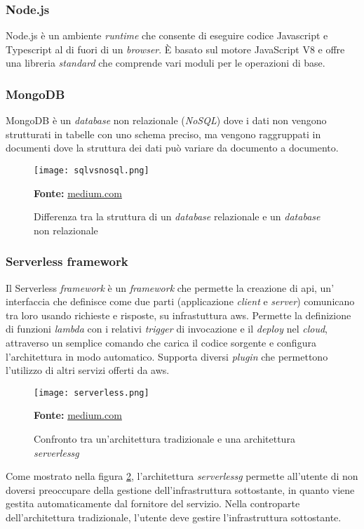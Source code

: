 \subsubsection{Node.js}
Node.js è un ambiente \textit{runtime} che consente di eseguire codice Javascript e Typescript al di fuori di un \textit{browser}. È basato sul motore JavaScript V8 e offre una libreria \textit{standard} che comprende vari moduli per le operazioni di base. 
\subsubsection{MongoDB}
MongoDB è un \textit{database} non relazionale (\textit{NoSQL}) dove i dati non vengono strutturati in tabelle con uno schema preciso, ma vengono raggruppati in documenti dove la struttura dei dati può variare da documento a documento.  
\begin{figure}[H]
    \centering
    \texttt{[image: sqlvsnosql.png]}
    \caption{Differenza tra la struttura di un \textit{database} relazionale e un \textit{database} non relazionale}
    \small \textbf{Fonte:} \href{https://naveen-metta.medium.com/decoding-the-database-dilemma-sql-vs-nosql-in-system-design-8666e21f4a58c}{medium.com}
    \label{fig:sql-vs-nosql}
\end{figure} 

\subsubsection{Serverless framework}
Il Serverless \textit{framework} è un \textit{framework} che permette la creazione di \gls{api}, un' interfaccia che definisce come due parti (applicazione \textit{client} e \textit{server}) comunicano tra loro usando richieste e risposte, su infrastuttura \gls{aws}. Permette la definizione di funzioni \textit{lambda} con i relativi \textit{trigger} di invocazione e il \textit{deploy} nel \textit{cloud}, attraverso un semplice comando che carica il codice sorgente e configura l'architettura in modo automatico. Supporta diversi \textit{plugin} che permettono l'utilizzo di altri servizi offerti da \gls{aws}.
\begin{figure}[H]
    \centering
    \texttt{[image: serverless.png]}
    \caption{Confronto tra un'architettura tradizionale e una architettura \textit{\gls{serverlessg}}}
    \small \textbf{Fonte:} \href{https://medium.com/canonichq/server-v-s-serverless-architecture-bf3cdab281664}{medium.com}
    \label{fig:Serverless}
\end{figure} 
\noindent
Come mostrato nella figura \ref{fig:Serverless}, l'architettura \textit{\gls{serverlessg}} permette all'utente di non doversi preoccupare della gestione dell'infrastruttura sottostante, in quanto viene gestita automaticamente dal fornitore del servizio. Nella controparte dell'architettura tradizionale, l'utente deve gestire l'infrastruttura sottostante.
